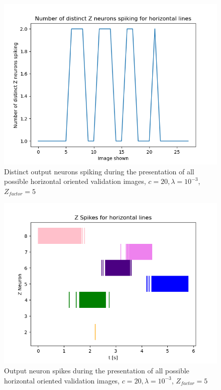 \begin{figure}
  \includegraphics[width=\linewidth]{figures/horvert/horvert_c20_3_Zfactor5_horizontalDistinctZ.png}
  \caption{Distinct output neurons spiking during the presentation of all possible horizontal oriented validation images, $c = 20, \lambda = 10^{-3}$, $Z_{factor} = 5$}
  \label{fig:horvert_c20_3_Zfactor5_horizontalDistinctZ}
\end{figure}
\begin{figure}
  \includegraphics[width=\linewidth]{figures/horvert/horvert_c20_3_Zfactor5_horizontalZSpikes.png}
  \caption{Output neuron spikes during the presentation of all possible horizontal oriented validation images, $c = 20, \lambda = 10^{-3}$, $Z_{factor} = 5$}
  \label{fig:horvert_c20_3_Zfactor5_horizontalZSpikes}
\end{figure}


